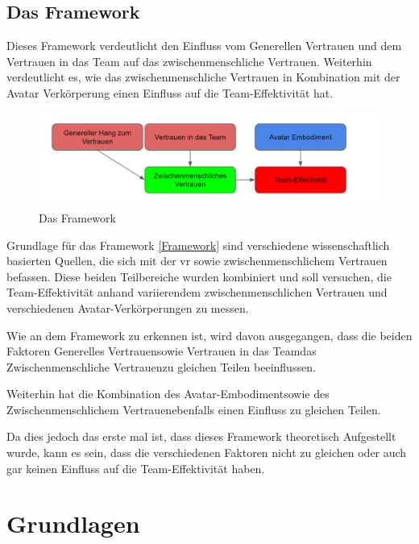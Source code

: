 \documentclass[a4paper,11pt]{article}%
\renewcommand{\\}{\vspace*{0.5\baselineskip} \newline}
\begin{document}
\subsection{Das Framework}

Dieses Framework verdeutlicht den Einfluss vom Generellen Vertrauen und dem Vertrauen in das Team auf das zwischenmenschliche Vertrauen. 
Weiterhin verdeutlicht es, wie das zwischenmenschliche Vertrauen in Kombination mit der Avatar Verkörperung einen Einfluss auf die Team-Effektivität hat.

	\begin{figure}[H]
		\begin{footnotesize}
			\includegraphics[width=\textwidth]{Abbildungen/Framework.JPG}\\
			\caption[Abbildung 1]{Das Framework}
			\label{Framework}
		\end{footnotesize}
	\end{figure}

Grundlage für das Framework \autoref{Framework} sind verschiedene wissenschaftlich basierten Quellen, die sich mit der \ac{vr} sowie zwischenmenschlichem Vertrauen befassen. Diese beiden Teilbereiche wurden kombiniert und soll versuchen, die Team-Effektivität anhand variierendem zwischenmenschlichen Vertrauen und verschiedenen Avatar-Verkörperungen zu messen.

Wie an dem Framework zu erkennen ist, wird davon ausgegangen, dass die beiden Faktoren \flqq Generelles Vertrauen\frqq sowie \flqq Vertrauen in das Team\frqq das \flqq Zwischenmenschliche Vertrauen\frqq zu gleichen Teilen beeinflussen. 

Weiterhin hat die Kombination des \flqq Avatar-Embodiment\frqq sowie des \flqq Zwischenmenschlichem Vertrauen\frqq ebenfalls einen Einfluss zu gleichen Teilen.

Da dies jedoch das erste mal ist, dass dieses Framework theoretisch Aufgestellt wurde, kann es sein, dass die verschiedenen Faktoren nicht zu gleichen oder auch gar keinen Einfluss auf die Team-Effektivität haben.

	\newpage
	\section{Grundlagen}
\end{document}
